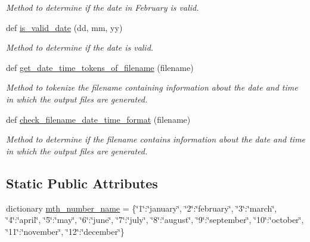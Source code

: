 \begin{DoxyCompactItemize}
\begin{DoxyCompactList}\small\item\em Method to determine if the date in February is valid. \end{DoxyCompactList}\item 
def \hyperlink{classutilities_1_1date__time__processing_1_1date__time__operations_acfa0ace983c6e5e715ee0fdb1a9a590b}{is\+\_\+valid\+\_\+date} (dd, mm, yy)
\begin{DoxyCompactList}\small\item\em Method to determine if the date is valid. \end{DoxyCompactList}\item 
def \hyperlink{classutilities_1_1date__time__processing_1_1date__time__operations_ad6047ac1098493c3511ec209f52250c0}{get\+\_\+date\+\_\+time\+\_\+tokens\+\_\+of\+\_\+filename} (filename)
\begin{DoxyCompactList}\small\item\em Method to tokenize the filename containing information about the date and time in which the output files are generated. \end{DoxyCompactList}\item 
def \hyperlink{classutilities_1_1date__time__processing_1_1date__time__operations_a3176a51995ec999ab7be5cd627019f1c}{check\+\_\+filename\+\_\+date\+\_\+time\+\_\+format} (filename)
\begin{DoxyCompactList}\small\item\em Method to determine if the filename contains information about the date and time in which the output files are generated. \end{DoxyCompactList}\end{DoxyCompactItemize}
\subsection*{Static Public Attributes}
\begin{DoxyCompactItemize}
\item 
dictionary \hyperlink{classutilities_1_1date__time__processing_1_1date__time__operations_a640d6fe5b1045e4c92057b524264295d}{mth\+\_\+number\+\_\+name} = \{\char`\"{}1\char`\"{}\+:\char`\"{}january\char`\"{}, \char`\"{}2\char`\"{}\+:\char`\"{}february\char`\"{}, \char`\"{}3\char`\"{}\+:\char`\"{}march\char`\"{}, \char`\"{}4\char`\"{}\+:\char`\"{}april\char`\"{}, \char`\"{}5\char`\"{}\+:\char`\"{}may\char`\"{}, \char`\"{}6\char`\"{}\+:\char`\"{}june\char`\"{}, \char`\"{}7\char`\"{}\+:\char`\"{}july\char`\"{}, \char`\"{}8\char`\"{}\+:\char`\"{}august\char`\"{}, \char`\"{}9\char`\"{}\+:\char`\"{}september\char`\"{}, \char`\"{}10\char`\"{}\+:\char`\"{}october\char`\"{}, \char`\"{}11\char`\"{}\+:\char`\"{}november\char`\"{}, \char`\"{}12\char`\"{}\+:\char`\"{}december\char`\"{}\}
\end{DoxyCompactItemize}


